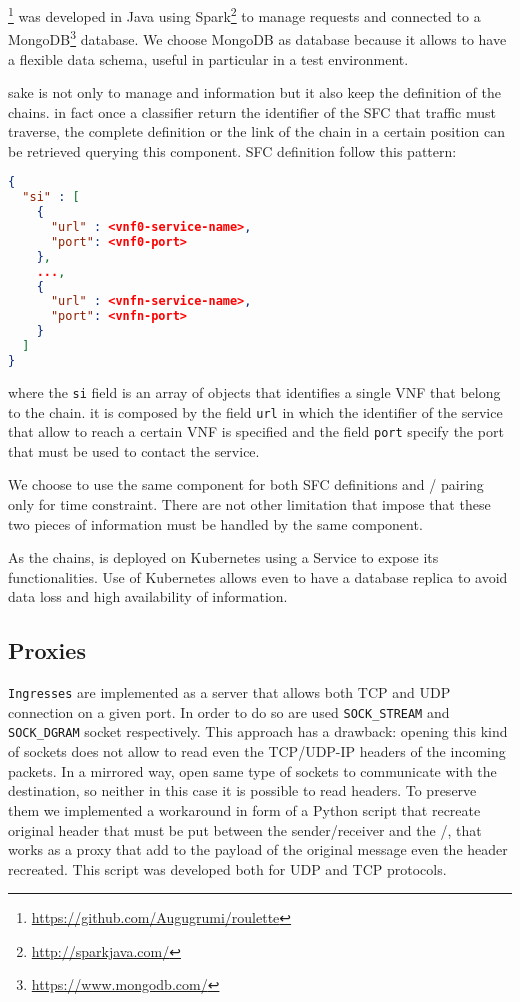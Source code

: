 \roulette{}\footnote{\url{https://github.com/Augugrumi/roulette}} was developed
in Java using Spark\footnote{\url{http://sparkjava.com/}} to manage requests and
connected to a MongoDB\footnote{\url{https://www.mongodb.com/}} database. We
choose MongoDB as database because it allows to have a flexible data schema,
useful in particular in a test environment.

\roulette{} sake is not only to manage \ingresses{} and \egresses{} information
but it also keep the definition of the chains. in fact once a classifier return
the identifier of the SFC that traffic must traverse, the complete definition
or the link of the chain in a certain position can be retrieved querying this
component. SFC definition follow this pattern:

\begin{lstlisting}[caption={Definition of an SFC}, captionpos=b, language=json]
{
  "si" : [
    {
      "url" : <vnf0-service-name>,
      "port": <vnf0-port>
    },
    ...,
    {
      "url" : <vnfn-service-name>,
      "port": <vnfn-port>
    }
  ]
}
\end{lstlisting}

where the \texttt{si} field is an array of objects that identifies a single VNF
that belong to the chain. it is composed by the field \texttt{url} in which the
identifier of the service that allow to reach a certain VNF is specified and the
field \texttt{port} specify the port that must be used to contact the service.

We choose to use the same component for both SFC definitions and 
\ingress{}/\egresses{} pairing only for time constraint. There are not other
limitation that impose that these two pieces of information must be handled by
the same component. 

As the chains, \roulette{} is deployed on Kubernetes using a Service to expose
its functionalities. Use of Kubernetes allows even to have a database replica to
avoid data loss and high availability of information.

\subsection{Proxies}
\texttt{Ingresses} are implemented as a server that allows both TCP and UDP
connection on a given port. In order to do so are used \verb!SOCK_STREAM! and
\verb!SOCK_DGRAM! socket respectively. This approach has a drawback: opening
this kind of sockets does not allow to read even the TCP/UDP-IP headers of the
incoming packets. In a mirrored way, \egresses{} open same type of sockets to
communicate with the destination, so neither in this case it is possible to read
headers. To preserve them we implemented a workaround in form of a Python script
that recreate original header that must be put between the sender/receiver and
the \ingress{}/\egresses{}, that works as a proxy that add to the payload of the
original message even the header recreated. This script was developed both for
UDP and TCP protocols.

